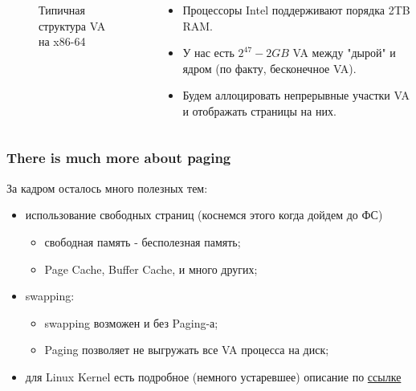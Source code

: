 \begin{frame}
\begin{columns}[T]
\begin{column}{.4\textwidth}
\begin{figure}
      \caption{Типичная структура VA на x86-64}
    \end{figure}
  \end{column}
  \begin{column}{.5\textwidth}
    \begin{itemize}
      \item Процессоры Intel поддерживают порядка 2TB RAM.
      \item У нас есть $2^{47} - 2GB$ VA между "дырой" и ядром (по факту, бесконечное VA).
      \item Будем аллоцировать непрерывные участки VA и отображать страницы на них.
    \end{itemize}
  \end{column}
\end{columns}
\end{frame}

\begin{frame}
\frametitle{There is much more about paging}

За кадром осталось много полезных тем:
\begin{itemize}
  \item<2-> использование свободных страниц (коснемся этого когда дойдем до ФС)
    \begin{itemize}
      \item свободная память - бесполезная память;
      \item Page Cache, Buffer Cache, и много других;
    \end{itemize}
  \item<3-> swapping:
    \begin{itemize}
      \item swapping возможен и без Paging-а;
      \item Paging позволяет не выгружать все VA процесса на диск;
    \end{itemize}
  \item<4-> для Linux Kernel есть подробное (немного устаревшее) описание по \href{https://www.kernel.org/doc/gorman/}{ссылке}
\end{itemize}

\end{frame}
